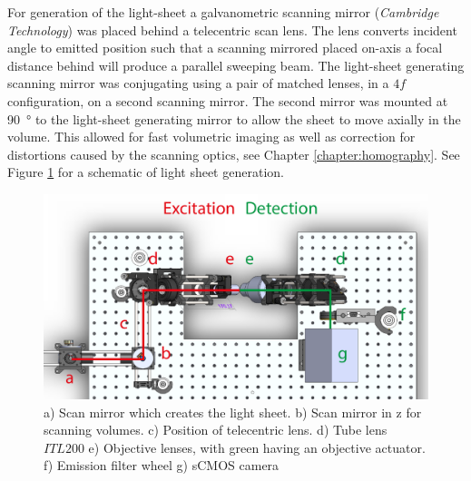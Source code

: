 For generation of the light-sheet a galvanometric scanning mirror (\emph{Cambridge Technology}) was placed behind a telecentric  scan lens.
The lens converts incident angle to emitted position such that a scanning mirrored placed on-axis a focal distance behind will produce a parallel sweeping beam.
The light-sheet generating scanning mirror was conjugating using a pair of matched lenses, in a $4f$ configuration, on a second scanning mirror.
The second mirror was mounted at \SI{90}{\degree} to the light-sheet generating mirror to allow the sheet to move axially in the volume.
This allowed for fast volumetric imaging as well as correction for distortions caused by the scanning optics, see Chapter \ref{chapter:homography}.
See Figure \ref{fig:soldiworks_top} for a schematic of light sheet generation.


%

\begin{figure}
	\centering
	\includegraphics[width=\linewidth]{./soldiworks_top}
	\caption[Top down schematic of SPIM]{a) Scan mirror which creates the light sheet.
b) Scan mirror in z for scanning volumes. c) Position of telecentric lens. d) Tube lens $ITL200$ e) Objective lenses, with green having an objective actuator. f) Emission filter wheel g) sCMOS camera}
	\label{fig:soldiworks_top}
\end{figure}


